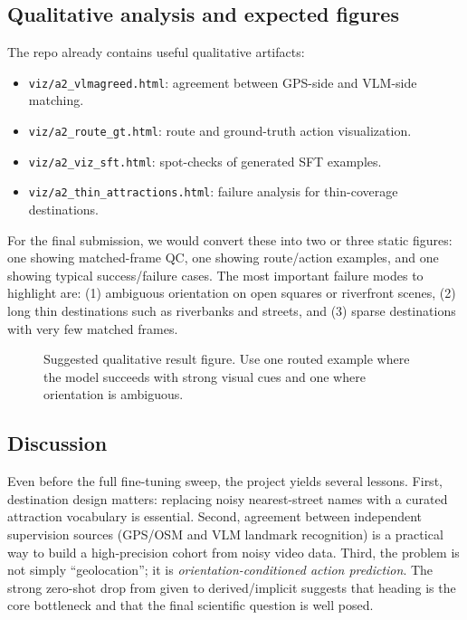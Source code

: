 \documentclass[10pt,twocolumn,letterpaper]{article}
\begin{document}
\subsection{Qualitative analysis and expected figures}
The repo already contains useful qualitative artifacts:
\begin{itemize}
\item \texttt{viz/a2\_vlmagreed.html}: agreement between GPS-side and VLM-side matching.
\item \texttt{viz/a2\_route\_gt.html}: route and ground-truth action visualization.
\item \texttt{viz/a2\_viz\_sft.html}: spot-checks of generated SFT examples.
\item \texttt{viz/a2\_thin\_attractions.html}: failure analysis for thin-coverage destinations.
\end{itemize}

For the final submission, we would convert these into two or three static figures: one showing matched-frame QC, one showing route/action examples, and one showing typical success/failure cases. The most important failure modes to highlight are: (1) ambiguous orientation on open squares or riverfront scenes, (2) long thin destinations such as riverbanks and streets, and (3) sparse destinations with very few matched frames.

\begin{figure}[t]
\centering
{}
\caption{Suggested qualitative result figure. Use one routed example where the model succeeds with strong visual cues and one where orientation is ambiguous.}
\label{fig:qual}
\end{figure}

\subsection{Discussion}
Even before the full fine-tuning sweep, the project yields several lessons. First, destination design matters: replacing noisy nearest-street names with a curated attraction vocabulary is essential. Second, agreement between independent supervision sources (GPS/OSM and VLM landmark recognition) is a practical way to build a high-precision cohort from noisy video data. Third, the problem is not simply ``geolocation''; it is \textit{orientation-conditioned action prediction}. The strong zero-shot drop from given to derived/implicit suggests that heading is the core bottleneck and that the final scientific question is well posed.
\end{document}
